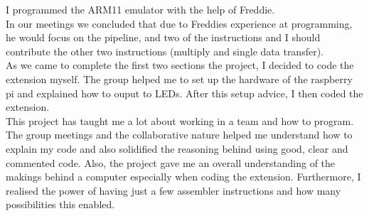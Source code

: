 I programmed the ARM11 emulator with the help of Freddie. 
~\\

In our meetings we concluded that due to Freddies experience at programming, he would focus on the pipeline, and two of the instructions and I should contribute the other two instructions (multiply and single data transfer).
~\\

As we came to complete the first two sections the project, I decided to code the extension myself. The group helped me to set up the hardware of the raspberry pi and explained how to ouput to LEDs. After this setup advice, I then coded the extension. 
~\\

This project has taught me a lot about working in a team and how to program. The group meetings and the collaborative nature helped me understand how to explain my code and also solidified the reasoning behind using good, clear and commented code. Also, the project gave me an overall understanding of the makings behind a computer especially when coding the extension. Furthermore, I realised the power of having just a few assembler instructions and how many possibilities this enabled.
